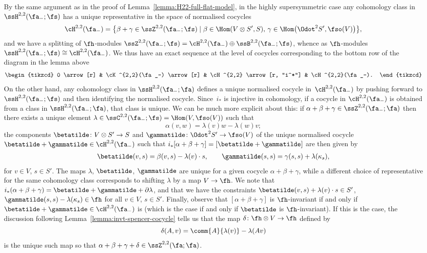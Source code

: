 By the same argument as in the proof of Lemma~\ref{lemma:H22-full-flat-model}, in the highly supersymmetric case any cohomology class in $\ssH^{2,2}(\fa_-;\fs)$ has a unique representative in the space of normalised cocycles
\[%
	\cH^{2,2}(\fa_-)
	= \bigl\{\beta+\gamma \in \ssZ^{2,2}(\fa_-;\fs)
		\mid
			\beta\in\Hom(V\otimes S',S),\,
			\gamma\in\Hom\bigl(\Odot^2S',\fso(V)\bigr)\bigr\},
\]
and we have a splitting of $\fh$-modules $\ssZ^{2,2}(\fa_-;\fs)=\cH^{2,2}(\fa_-)\oplus\ssB^{2,2}(\fa_-;\fs)$, whence as $\fh$-modules $\ssH^{2,2}(\fa_-;\fs) \cong \cH^{2,2}(\fa_-)$. We thus have an exact sequence at the level of cocycles corresponding to the bottom row of the diagram in the lemma above
\[
\begin{tikzcd}
	0 \arrow[r]
	& \cK^{2,2}(\fa_-) \arrow[r]
	& \cH^{2,2} \arrow[r, "i^*"]
	& \cH^{2,2}(\fa_-).
\end{tikzcd}
\]
On the other hand, any cohomology class in $\ssH^{2,2}(\fa_-;\fa)$ defines a unique normalised cocycle in~$\cH^{2,2}(\fa_-)$ by pushing forward to $\ssH^{2,2}(\fa_-;\fs)$ and then identifying the normalised cocycle. Since~$i_*$ is injective in cohomology, if a cocycle in $\cH^{2,2}(\fa_-)$ is obtained from a class in $\ssH^{2,2}(\fa_-;\fa)$, that class is unique. We can be much more explicit about this: if $\alpha+\beta+\gamma\in\ssZ^{2,2}(\fa_-;\fa)$ then there exists a unique element $\lambda\in\ssC^{2,2}(\fa_-;\fs)=\Hom(V,\fso(V))$ such that
\begin{equation}\label{eq:alpha-lambda}
	\alpha(v,w) = \lambda(v)w - \lambda(w)v;
\end{equation}
the components $\betatilde\colon V\otimes S' \to S$ and $\gammatilde\colon \Odot^2 S' \to \fso(V)$ of the unique normalised cocycle $\betatilde+\gammatilde\in\cH^{2,2}(\fa_-)$ such that $i_*[\alpha+\beta+\gamma]=[\betatilde+\gammatilde]$ are then given by
\begin{align}%
	\betatilde(v,s) = \beta(v,s) - \lambda(v)\cdot s,\qquad
	\gammatilde(s,s) = \gamma(s,s) + \lambda(\kappa_s), \label{eq:gamma-tilde}
\end{align}
for $v\in V$, $s\in S'$. The maps $\lambda$, $\betatilde$, $\gammatilde$ are unique for a given cocycle $\alpha+\beta+\gamma$, while a different choice of representative for the same cohomology class corresponds to shifting $\lambda$ by a map $V\to\fh$. We note that
$i_*(\alpha+\beta+\gamma) = \betatilde+\gammatilde+\partial\lambda$,
and that we have the constraints
$\betatilde(v,s) + \lambda(v)\cdot s \in S'$, $
	\gammatilde(s,s) - \lambda(\kappa_s) \in \fh$
for all $v\in V$, $s\in S'$. Finally, observe that $[\alpha+\beta+\gamma]$ is $\fh$-invariant if and only if $\betatilde+\gammatilde\in\cH^{2,2}(\fa_-)$ is (which is the case if and only if $\betatilde$ is $\fh$-invariant). If this is the case, the discussion following Lemma~\ref{lemma:invt-spencer-cocycle} tells us that the map $\delta\colon \fh\otimes V\to\fh$ defined by
\begin{equation}\label{eq:delta-lambda}
	\delta(A,v) = \comm{A}{\lambda(v)} - \lambda(Av)
\end{equation}
is the unique such map so that $\alpha+\beta+\gamma+\delta\in\ssZ^{2,2}(\fa;\fa)$.

